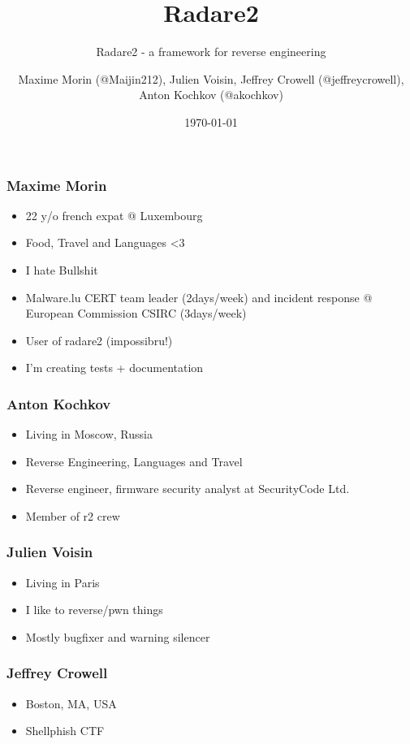 \documentclass[10pt,pdf,utf8,english,compress,hyperref={unicode}]{beamer}
\title{Radare2}
\subtitle{Radare2 - a framework for reverse engineering}
\author{Maxime Morin (@Maijin212), Julien Voisin, Jeffrey Crowell (@jeffreycrowell), Anton Kochkov (@akochkov)}
\date{\today}
\institute{Hack.lu 10-2015}
\begin{document}
\maketitle

\begin{frame}[fragile]
  \frametitle{Maxime Morin}
    \begin{itemize}
    \item 22 y/o french expat @ Luxembourg
    \item Food, Travel and Languages <3
    \item I hate Bullshit
    \item Malware.lu CERT team leader (2days/week) and incident response @ European Commission CSIRC (3days/week)
    \item User of radare2 (impossibru!)
    \item I'm creating tests + documentation
    \end{itemize}
\end{frame}

\begin{frame}[fragile]
  \frametitle{Anton Kochkov}
    \begin{itemize}
    \item Living in Moscow, Russia
    \item Reverse Engineering, Languages and Travel
    \item Reverse engineer, firmware security analyst at SecurityCode Ltd.
    \item Member of r2 crew
    \end{itemize}
\end{frame}

\begin{frame}[fragile]
  \frametitle{Julien Voisin}
    \begin{itemize}
    \item Living in Paris
    \item I like to reverse/pwn things
    \item Mostly bugfixer and warning silencer
    \end{itemize}
\end{frame}

\begin{frame}[fragile]
  \frametitle{Jeffrey Crowell}
    \begin{itemize}
			\item Boston, MA, USA
			\item Shellphish CTF
    \end{itemize}
\end{frame}
\end{document}
